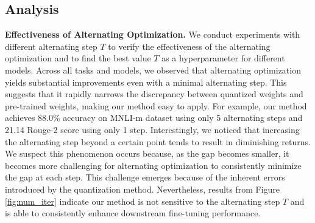 

\subsection{Analysis}
\textbf{Effectiveness of Alternating Optimization.}
We conduct experiments with different alternating step $T$ to verify the effectiveness of the alternating optimization and to find the best value $T$ as a hyperparameter for different models. 
Across all tasks and models, we observed that alternating optimization yields substantial improvements even with a minimal alternating step. This suggests that it rapidly narrows the discrepancy between quantized weights and pre-trained weights, making our method easy to apply. For example, our method achieves 88.0\% accuracy on MNLI-m dataset using only 5 alternating steps and 21.14 Rouge-2 score using only 1 step. Interestingly, we noticed that increasing the alternating step beyond a certain point tends to result in diminishing returns. We suspect this phenomenon occurs because, as the gap becomes smaller, it becomes more challenging for alternating optimization to consistently minimize the gap at each step. This challenge emerges because of the inherent errors introduced by the quantization method. Nevertheless, results from Figure \ref{fig:num_iter} indicate our method is not sensitive to the alternating step $T$ and is able to consistently enhance downstream fine-tuning performance.

